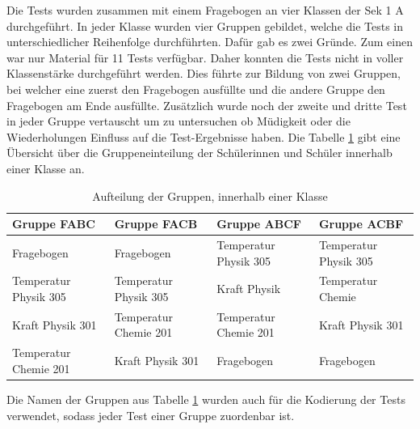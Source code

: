 Die Tests wurden zusammen mit einem Fragebogen an vier Klassen der Sek 1 A durchgeführt. In jeder Klasse wurden vier Gruppen gebildet, welche die Tests in unterschiedlicher Reihenfolge durchführten. Dafür gab es zwei Gründe. Zum einen war nur Material für 11 Tests verfügbar. Daher konnten die Tests nicht in voller Klassenstärke durchgeführt werden. Dies führte zur Bildung von zwei Gruppen, bei welcher eine zuerst den Fragebogen ausfüllte und die andere Gruppe den Fragebogen am Ende ausfüllte. Zusätzlich wurde noch der zweite und dritte Test in jeder Gruppe vertauscht um zu untersuchen ob Müdigkeit oder die Wiederholungen Einfluss auf die Test-Ergebnisse haben. Die Tabelle \ref{tab:Gruppenaufteilung} gibt eine Übersicht über die Gruppeneinteilung der Schülerinnen und Schüler innerhalb einer Klasse an.
\begin{table}[htbp]
  \centering
  \begin{tabular}{@{}p{3.1cm}p{3.1cm}p{3.1cm}p{3.1cm}@{}}
  \toprule
   Gruppe FABC & Gruppe FACB & Gruppe ABCF & Gruppe ACBF \\ 
  \midrule
   Fragebogen & Fragebogen & Temperatur \newline  Physik 305 & Temperatur \newline  Physik 305 \\[0.2cm]
   Temperatur \newline  Physik 305 & Temperatur \newline  Physik 305 & Kraft \newline  Physik & Temperatur Chemie \\ [0.2cm]
   Kraft  \newline Physik 301 & Temperatur \newline  Chemie 201 & Temperatur \newline  Chemie 201 & Kraft \newline  Physik 301 \\ [0.2cm]
   Temperatur \newline  Chemie 201 & Kraft \newline  Physik 301 & Fragebogen& Fragebogen\\ 
   
  \bottomrule
  \end{tabular} 
  \caption{Aufteilung der Gruppen, innerhalb einer Klasse}
  \label{tab:Gruppenaufteilung}
\end{table}

Die Namen der Gruppen aus Tabelle \ref{tab:Gruppenaufteilung} wurden auch für die Kodierung der Tests verwendet, sodass jeder Test einer Gruppe zuordenbar ist.

